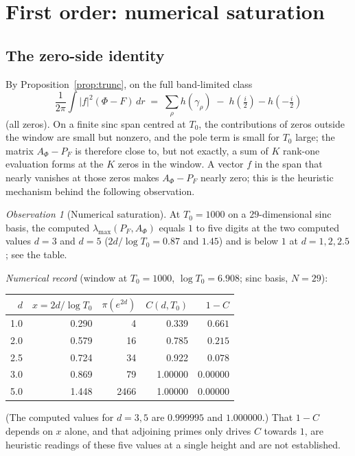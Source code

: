 \documentclass[11pt]{amsart}
\theoremstyle{definition}
\theoremstyle{remark}
\newtheorem{observation}[theorem]{Observation}
\newcommand{\Cband}{C}
\newcommand{\Aphi}{A_\Phi}
\newcommand{\Pf}{P_F}
\begin{document}
\section{First order: numerical saturation}\label{sec:first}

\subsection{The zero-side identity}
By Proposition~\ref{prop:trunc}, on the full band-limited class
\begin{equation}\label{eq:zeroside}
\frac1{2\pi}\int|f|^2(\Phi-F)\,dr\;=\;\sum_{\rho}h(\gamma_\rho)\;-\;h(\tfrac i2)-h(-\tfrac i2)
\end{equation}
(all zeros). On a finite sinc span centred at $T_0$, the contributions of zeros outside the window are small
but nonzero, and the pole term is small for $T_0$ large; the matrix $\Aphi-\Pf$ is therefore close to, but
not exactly, a sum of $K$ rank-one evaluation forms at the $K$ zeros in the window. A vector $f$ in the span
that nearly vanishes at those zeros makes $\Aphi-\Pf$ nearly zero; this is the heuristic mechanism behind the
following observation.

\begin{observation}[Numerical saturation]\label{thm:saturation}
At $T_0=1000$ on a $29$-dimensional sinc basis, the computed $\lambda_{\max}(\Pf,\Aphi)$ equals $1$ to five
digits at the two computed values $d=3$ and $d=5$ \textup{(}$2d/\log T_0=0.87$ and $1.45$\textup{)} and is below $1$ at $d=1,2,2.5$; see the table.
\end{observation}

\noindent\emph{Numerical record} (window at $T_0=1000$, $\log T_0=6.908$; sinc basis, $N=29$):
\begin{center}
\begin{tabular}{rrrrr}
\toprule
$d$ & $x=2d/\log T_0$ & $\pi(e^{2d})$ & $\Cband(d,T_0)$ & $1-\Cband$\\
\midrule
1.0 & 0.290 & 4    & 0.339 & $0.661$\\
2.0 & 0.579 & 16   & 0.785 & $0.215$\\
2.5 & 0.724 & 34   & 0.922 & $0.078$\\
3.0 & 0.869 & 79   & 1.00000 & $0.00000$\\
5.0 & 1.448 & 2466 & 1.00000 & $0.00000$\\
\bottomrule
\end{tabular}
\end{center}
(The computed values for $d=3,5$ are $0.999995$ and $1.000000$.) That $1-\Cband$ depends on $x$ alone, and
that adjoining primes only drives $\Cband$ towards $1$, are heuristic readings of these five values at a single
height and are not established.
\end{document}
